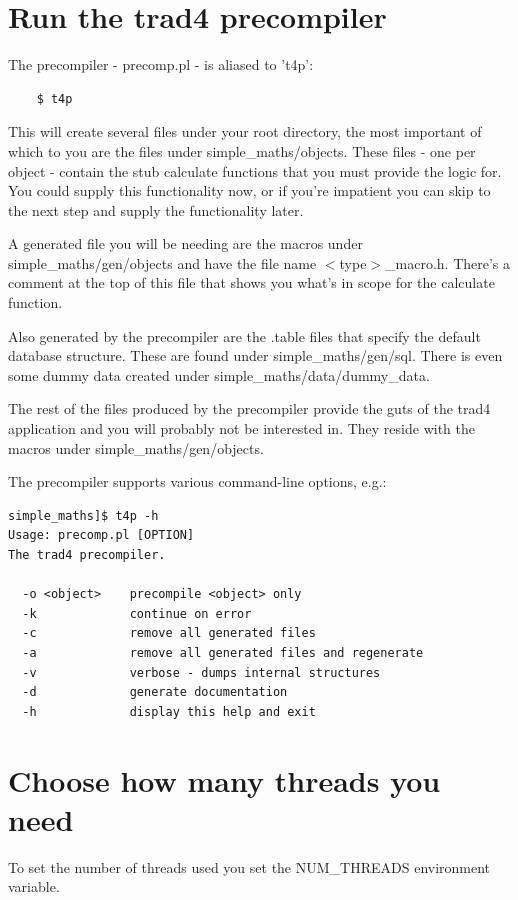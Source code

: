 \documentclass{report}
\begin{document}
\section{Run the trad4 precompiler}

The precompiler - precomp.pl - is aliased to 't4p':

\begin{verbatim}
    $ t4p
\end{verbatim}

This will create several files under your root directory, the most important of which to you are the files under simple_maths/objects. These files - one per object - contain the stub calculate functions that you must provide the logic for.  You could supply this functionality now, or if you're impatient you can skip to the next step and supply the functionality later.

A generated file you will be needing are the macros under simple_maths/gen/objects and have the file name $<$type$>$_macro.h. There's a comment at the top of this file that shows you what's in scope for the calculate function.

Also generated by the precompiler are the .table files that specify the default database structure. These are found under simple_maths/gen/sql. There is even some dummy data created under simple_maths/data/dummy_data.

The rest of the files produced by the precompiler provide the guts of the trad4 application and you will probably not be interested in. They reside with the macros under simple_maths/gen/objects.

The precompiler supports various command-line options, e.g.:

\begin{verbatim}
simple_maths]$ t4p -h
Usage: precomp.pl [OPTION]
The trad4 precompiler.

  -o <object>    precompile <object> only
  -k             continue on error
  -c             remove all generated files
  -a             remove all generated files and regenerate
  -v             verbose - dumps internal structures
  -d             generate documentation
  -h             display this help and exit
\end{verbatim}

\section{Choose how many threads you need}

To set the number of threads used you set the NUM_THREADS environment variable.
\end{document}
